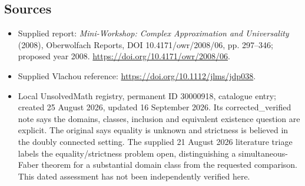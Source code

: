 \documentclass[11pt]{article}
\begin{document}
\subsection{Sources}
\begin{itemize}
\item Supplied report: \emph{Mini-Workshop: Complex Approximation and Universality} (2008), Oberwolfach Reports, DOI 10.4171/owr/2008/06, pp. 297--346; proposed year 2008. \url{https://doi.org/10.4171/owr/2008/06}.
\item Supplied Vlachou reference: \url{https://doi.org/10.1112/jlms/jdp038}.
\item Local UnsolvedMath registry, permanent ID 30000918, catalogue entry; created 25 August 2026, updated 16 September 2026. Its corrected\_verified note says the domains, classes, inclusion and equivalent existence question are explicit. The original says equality is unknown and strictness is believed in the doubly connected setting. The supplied 21 August 2026 literature triage labels the equality/strictness problem open, distinguishing a simultaneous-Faber theorem for a substantial domain class from the requested comparison. This dated assessment has not been independently verified here.
\end{itemize}
\end{document}
